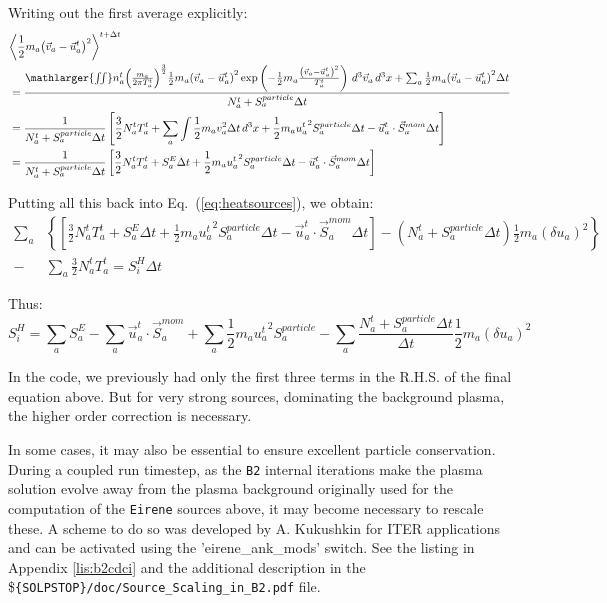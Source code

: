 \documentclass[a4paper,10pt]{report}
\begin{document}
Writing out the first average explicitly:
\begin{align*}
& {\left \langle \frac{1}{2} m_a {\left( \vec{v}_a - \vec{u}_a^t \right)}^2 \right \rangle}^{t+\Delta t} \\
& = \frac{\mathlarger{\iint} n_a^t {\left( \frac{m_a}{2 \pi T_a^t} \right)}^{\frac{3}{2}} \frac{1}{2} m_a
{\left( \vec{v}_a - \vec{u}_a^t \right)}^2 \exp \left( -\frac{1}{2}m_a\frac{{\left( \vec{v}_a - \vec{u}_a^t \right)}^2}{T_a^t} \right) \, d^3 \vec{v}_a \, d^3x
+ \sum_a \frac{1}{2}m_a {\left( \vec{v}_a - \vec{u}_a^t \right)}^2 \Delta t }{N_a^t + S_a^{particle} \Delta t} \\
&= \frac{1}{N_a^t + S_a^{particle} \Delta t} \left[ \frac{3}{2} N_a^t T_a^t + \sum_a \int \frac{1}{2} m_a v_a^2 \Delta t \, d^3x
+ \frac{1}{2}m_a {u_a^t}^2 S_a^{particle} \Delta t - \vec{u}_a^t\cdot\vec{S}_a^{mom} \Delta t \right]
\\
&= \frac{1}{N_a^t + S_a^{particle} \Delta t} \left[ \frac{3}{2} N_a^t T_a^t + S_a^E \Delta t + \frac{1}{2}m_a{u_a^t}^2S_a^{particle} \Delta t - \vec{u}_a^t\cdot\vec{S}_a^{mom} \Delta t \right]
\end{align*}

Putting all this back into Eq.~(\ref{eq:heatsources}), we obtain:
\begin{align*}
\sum_a & \left\{ \left[ \frac{3}{2} N_a^t T_a^t + S_a^E \Delta t + \frac{1}{2}m_a{u_a^t}^2S_a^{particle} \Delta t
- \vec{u}_a^t\cdot\vec{S}_a^{mom} \Delta t \right] -
\left( N_a^t + S_a^{particle} \Delta t \right) \frac{1}{2} m_a {(\delta u_a)}^2 \right\} \\
-& \sum_a \frac{3}{2} N_a^t T_a^t = S_i^H \Delta t
\end{align*}

Thus:
\begin{equation}\label{eq:sources}
S_i^H = \sum_a S_a^E - \sum_a \vec{u}_a^t\cdot\vec{S}_a^{mom} + \sum_a \frac{1}{2} m_a {u_a^t}^2 S_a^{particle} - \sum_a \frac{N_a^t + S_a^{particle} \Delta t}{\Delta t} \frac{1}{2} m_a {(\delta u_a)}^2
\end{equation}

In the code, we previously had only the first three terms in the R.H.S. of the final equation above. But for very strong sources, dominating the background plasma, the higher order correction is necessary.

In some cases, it may also be essential to ensure excellent particle conservation. During a coupled
run timestep, as the {\tt B2} internal iterations make the plasma solution evolve away from the plasma
background originally used for the computation of the {\tt Eirene} sources above, it may become
necessary to rescale these. A scheme to do so was developed by A. Kukushkin for ITER applications \cite{Kukushkin2002PPCF}
and can be activated using the 'eirene\_ank\_mods' switch. See the listing in Appendix \ref{lis:b2cdci}
and the additional description in the \${\tt \{SOLPSTOP\}/doc/Source\_Scaling\_in\_B2.pdf} file.
\end{document}
